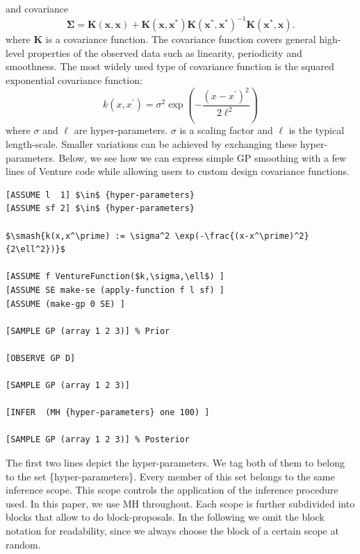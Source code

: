 \documentclass{article} %
\begin{document}
and covariance
\begin{equation}
\label{eq:conditonalGaussianCovariance}
\bm{\Sigma} =  \mathbf{K}(\mathbf{x},\mathbf{x}) + \mathbf{K}(\mathbf{x},\mathbf{x}^*)\mathbf{K}(\mathbf{x}^*,\mathbf{x}^*)^{-1} \mathbf{K}(\mathbf{x}^*,\mathbf{x}).
\end{equation}
where $\mathbf{K}$ is a covariance function. The covariance function covers general high-level properties of the observed data such as linearity, periodicity and smoothness. The most widely used type of covariance function is the squared exponential covariance function:
\begin{equation}
k(x,x^\prime) = \sigma^2 \exp(-\frac{(x-x^\prime)^2}{2\ell^2})
\end{equation}
where $\sigma$ and $\ell$ are hyper-parameters. $\sigma$ is a scaling factor and $\ell$ is the typical length-scale.
Smaller variations can be achieved by exchanging these hyper-parameters. Below, we see how we can express simple GP smoothing with a few lines of Venture code while allowing users to custom design covariance functions. 
\begin{minipage}{\linewidth}
\belowcaptionskip=-10pt
\begin{lstlisting}[frame=single,label=alg:gpsmooth,caption=GP Smoothing,mathescape]
[ASSUME l  1] $\in$ {hyper-parameters} 
[ASSUME sf 2] $\in$ {hyper-parameters}

$\smash{k(x,x^\prime) := \sigma^2 \exp(-\frac{(x-x^\prime)^2}{2\ell^2})}$

[ASSUME f VentureFunction($k,\sigma,\ell$) ]
[ASSUME SE make-se (apply-function f l sf) ]
[ASSUME (make-gp 0 SE) ]

[SAMPLE GP (array 1 2 3)] % Prior

[OBSERVE GP D]

[SAMPLE GP (array 1 2 3)] 

[INFER  (MH {hyper-parameters} one 100) ]

[SAMPLE GP (array 1 2 3)] % Posterior

\end{lstlisting}
\end{minipage}

The first two lines depict the hyper-parameters. We tag both of them to belong to the set \{hyper-parameters\}. Every member of this set belongs to the same inference scope. This scope controls the application of the inference procedure used. In this paper, we use MH throughout. Each scope is further subdivided into blocks that allow to do block-proposals. In the following we omit the block notation for readability, since we always choose the block of a certain scope at random.
\end{document}
